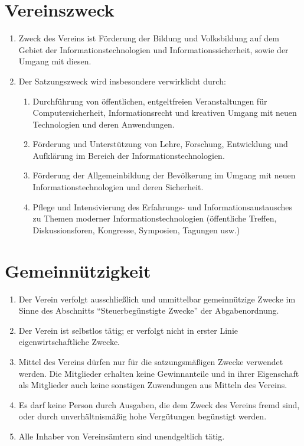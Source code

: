 \documentclass[a4paper,ngerman]{scrartcl}
\begin{document}
\section{Vereinszweck}
\begin{enumerate}
\item Zweck des Vereins ist Förderung der Bildung und Volksbildung auf dem Gebiet der Informationstechnologien und Informationssicherheit, sowie der Umgang mit diesen.
\item Der Satzungszweck wird insbesondere verwirklicht durch:
\begin{enumerate}
\item Durchführung von öffentlichen, entgeltfreien Veranstaltungen für Computersicherheit, Informationsrecht und kreativen Umgang mit neuen Technologien und deren Anwendungen.
\item Förderung und Unterstützung von Lehre, Forschung, Entwicklung und Aufklärung im Bereich der Informationstechnologien.
\item Förderung der Allgemeinbildung der Bevölkerung im Umgang mit neuen Informationstechnologien und deren Sicherheit.
\item Pflege und Intensivierung des Erfahrungs- und Informationsaustausches zu Themen moderner Informationstechnologien (öffentliche Treffen, Diskussionsforen, Kongresse, Symposien, Tagungen usw.)
\end{enumerate}
\end{enumerate}

\section{Gemeinnützigkeit}
\begin{enumerate}
\item Der Verein verfolgt ausschließlich und unmittelbar gemeinnützige Zwecke im Sinne des Abschnitts "`Steuerbegünstigte Zwecke"' der Abgabenordnung.
\item Der Verein ist selbstlos tätig; er verfolgt nicht in erster Linie eigenwirtschaftliche Zwecke.
\item Mittel des Vereins dürfen nur für die satzungsmäßigen Zwecke verwendet werden. Die Mitglieder erhalten keine Gewinnanteile und in ihrer Eigenschaft als Mitglieder auch keine sonstigen Zuwendungen aus Mitteln des Vereins.
\item Es darf keine Person durch Ausgaben, die dem Zweck des Vereins fremd sind, oder durch unverhältnismäßig hohe Vergütungen begünstigt werden.
\item Alle Inhaber von Vereinsämtern sind unendgeltlich tätig.
\end{enumerate}
\end{document}
